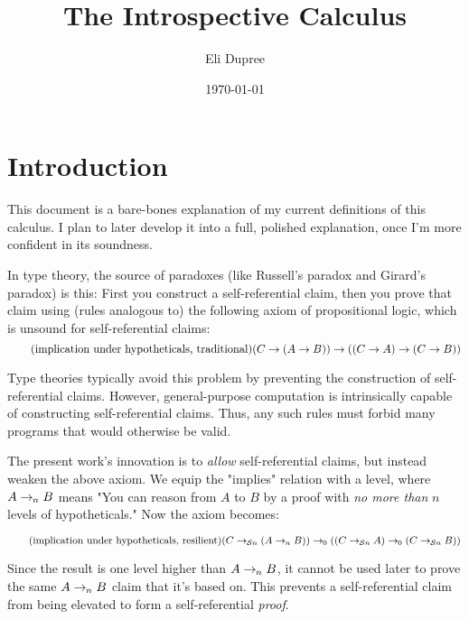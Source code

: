 \documentclass{article}
\title{The Introspective Calculus}
\author{Eli Dupree}
\date{\today}
\begin{document}
  \maketitle
  
  \section{Introduction}
  
  This document is a bare-bones explanation of my current definitions of this calculus.
  I plan to later develop it into a full, polished explanation, once I'm more confident in its soundness.
  
  In type theory, the source of paradoxes (like Russell's paradox and Girard's paradox) is this: First you construct a self-referential claim, then you prove that claim using (rules analogous to) the following axiom of propositional logic, which is unsound for self-referential claims:
  \begin{equation*}
    \tag{implication under hypotheticals, traditional}
    (C \rightarrow (A \rightarrow B)) \rightarrow ((C \rightarrow A) \rightarrow (C \rightarrow B))
    \vspace{0.8em}
  \end{equation*}
  
  Type theories typically avoid this problem by preventing the construction of self-referential claims. However, general-purpose computation is intrinsically capable of constructing self-referential claims. Thus, any such rules must forbid many programs that would otherwise be valid.
  
  \renewcommand{\implies}[1]{\rightarrow_{\hspace{-0.04em}#1}}
  The present work's innovation is to \emph{allow} self-referential claims, but instead weaken the above axiom. We equip the "implies" relation with a level, where $A \implies{n} B$ means "You can reason from $A$ to $B$ by a proof with \emph{no more than} $n$ levels of hypotheticals." Now the axiom becomes:
  
  \newcommand{\lzero}{0}
  \newcommand{\lsucc}[1]{\mathcal{S} #1}
  \begin{equation*}
    \tag{implication under hypotheticals, resilient}
    (C \implies{\lsucc n} (A \implies{n} B)) \implies{\lzero} ((C \implies{\lsucc n} A) \implies{\lzero} (C \implies{\lsucc n} B))
    \vspace{0.8em}
  \end{equation*}
  
  Since the result is one level higher than $A \implies{n} B$, it cannot be used later to prove the same $A \implies{n} B$ claim that it's based on. This prevents a self-referential claim from being elevated to form a self-referential \emph{proof}.
  
\end{document}
